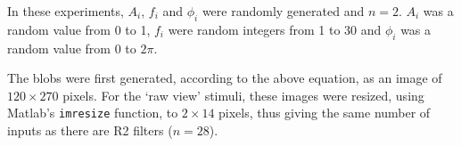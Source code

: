 In these experiments, $A_i$, $f_i$ and $\phi_i$ were randomly generated and $n=2$.
$A_i$ was a random value from 0 to 1, $f_i$ were random integers from 1 to 30 and $\phi_i$ was a random value from 0 to $2\pi$.
\begin{comment}
        nvar = 1000;
        nwave = 2;
        maxfreq = 30;
        maxamp = 1;
\end{comment}

The blobs were first generated, according to the above equation, as an image of $120\times 270$ pixels.
For the `raw view' stimuli, these images were resized, using Matlab's \texttt{imresize} function, to $2\times 14$ pixels, thus giving the same number of inputs as there are R2 filters ($n=28$).

\begin{comment}
\subsubsection*{Grading performance of neural networks}
The performance of neural networks was graded by calculating the \ac{rms} difference between the matrix of true values for the parameters with the network's output:
$$
E(\mathbf{y},\mathbf{t}) = \sqrt{\frac{\sum\limits_{i=1}^{n} (\mathbf{y}_i-\mathbf{t}_i)^2}{n}}
$$
where $E(\mathbf{y},\mathbf{t})$ is the mean error score, computed from the vector of outputs given by the network, $\mathbf{y}$, and the vector of true values, $\mathbf{t}$.
Hence, for a network that computed the values of all parameters accurately, a graph of the network's output \emph{vs.} the true values would give the line $y=x$ and an error score of 0 over the whole range of values.
\end{comment}
